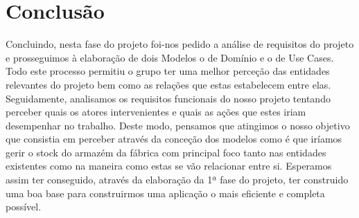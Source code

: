 \documentclass[11pt]{article}
\begin{document}
\vspace{2.5cm}
	    
\section{Conclusão}

Concluindo, nesta fase do projeto foi-nos pedido a análise de requisitos do projeto e prosseguimos à elaboração de dois Modelos o de Domínio e o de Use Cases. Todo este processo permitiu o grupo ter uma melhor perceção das entidades relevantes do projeto bem como as relações que estas estabelecem entre elas. Seguidamente, analisamos os requisitos funcionais do nosso projeto tentando perceber quais os atores intervenientes e quais as ações que estes iriam desempenhar no trabalho. Deste modo, pensamos que atingimos o nosso objetivo que consistia em perceber através da conceção dos modelos como é que iríamos gerir o stock do armazém da fábrica com principal foco tanto nas entidades existentes como na maneira como estas se vão relacionar entre si. Esperamos assim ter conseguido, através da elaboração da 1ª fase do projeto, ter construido uma boa base para construirmos uma aplicação o mais eficiente e completa possível.
\end{document}
